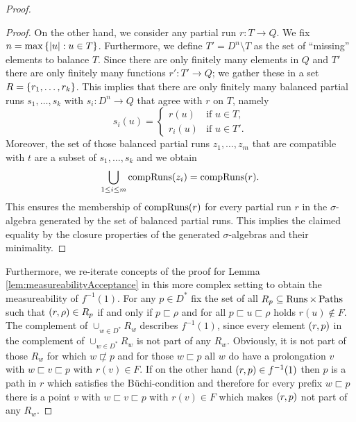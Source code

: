 \begin{proof}
\begin{proof}
    On the other hand, we consider any partial run $r:T\rightarrow Q$. We fix
    $n = \max\left\{\left\vert{u}\right\vert:u\in T\right\}$. Furthermore, we define 
    $T' = D^{n}\setminus T$ as the set of \enquote{missing} elements to balance
    $T$. Since there are only finitely many elements in $Q$ and $T'$ there are 
    only finitely many functions $r':T'\rightarrow Q$; we gather these in a set
    $R = \left\{r_{1}, \dots, r_{k}\right\}$. This implies that there are only finitely
    many balanced partial runs $s_{1}, \dots, s_{k}$ with 
    $s_{i}:D^{n}\rightarrow Q$ that agree with $r$ on $T$, namely
    \begin{equation*}
      s_{i}(u) = \begin{cases}
        r(u)&\text{if }u\in T,\\
        r_{i}(u)&\text{if }u\in T'.
      \end{cases}
    \end{equation*}
    Moreover, the set of those balanced partial runs $z_{1}, \dots, z_{m}$ that 
    are compatible with $t$ are a subset of $s_{1}, \dots, s_{k}$ and we obtain
    \begin{equation*}
      \bigcup_{1\leq i\leq m}\operatorname{compRuns}(z_{i}) = \operatorname{compRuns}(r).
    \end{equation*}
    This ensures the membership of $\operatorname{compRuns}(r)$ for every partial run $r$ in
    the $\sigma$-algebra generated by the set of balanced partial runs. This
    implies the claimed equality by the closure properties of the generated 
    $\sigma$-algebras and their minimality.
  \end{proof}

  Furthermore, we re-iterate concepts of the proof for Lemma 
  \ref{lem:measureabilityAcceptance} in this more complex setting to obtain the
  measureability of $f^{-1}(1)$. For any $p\in D^{*}$ fix the set of all 
  $R_{p}\subseteq\operatorname{Runs}\times\operatorname{Paths}$ such that $\left(r,\rho\right)\in R_{p}$ if and 
  only if $p\sqsubset\rho$ and for all $p\sqsubset u\sqsubset\rho$ holds 
  $r(u)\notin F$. The complement of $\cup_{w\in D^{*}}R_{w}$ describes 
  $f^{-1}(1)$, since every element $\left(r,p\right)$ in the complement of 
  $\cup_{w\in D^{*}}R_{w}$ is not part of any $R_{w}$. Obviously, it is not 
  part of those $R_{w}$ for which $w\not\sqsubset p$ and for those $w\sqsubset 
  p$ all $w$ do have a prolongation $v$ with $w\sqsubset v\sqsubset p$ with 
  $r(v)\in F$. If on the other hand $\left(r,p\right)\in f^{-1}(1)$ then $p$ is a 
  path in $r$ which satisfies the Büchi-condition and therefore for every 
  prefix $w\sqsubset p$ there is a point $v$ with $w\sqsubset v\sqsubset p$ 
  with $r(v)\in F$ which makes $\left(r,p\right)$ not part of any $R_{w}$.


\end{proof}
